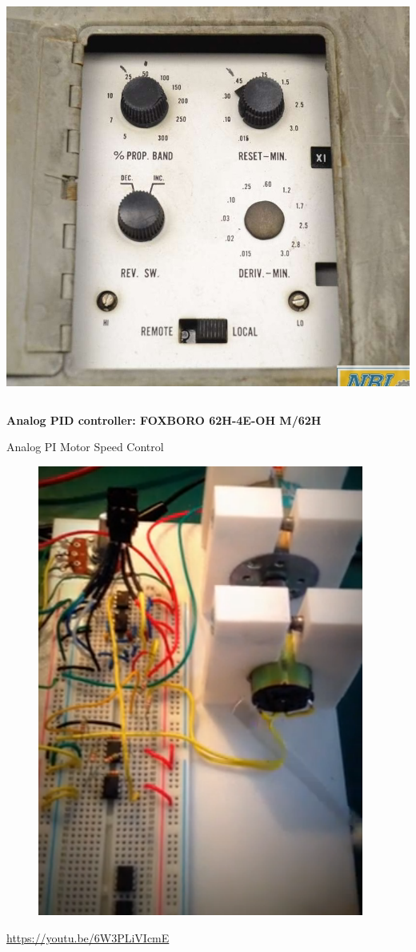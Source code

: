 \begin{frame}
\begin{columns}
\begin{column}{0.5\linewidth}
			\includegraphics[height=0.6\textheight]{img/fb4}
		\end{column}
	\end{columns}
	\begin{center}
		\textbf{Analog PID controller: FOXBORO 62H-4E-OH M/62H}
	\end{center}
\end{frame}

\begin{frame}{Analog PI Motor Speed Control}
	\begin{figure}
		\centering
		\includegraphics[width=0.4\linewidth]{img/feedback_motor}
	\end{figure}
	\url{https://youtu.be/6W3PLiVIcmE}
\end{frame}

